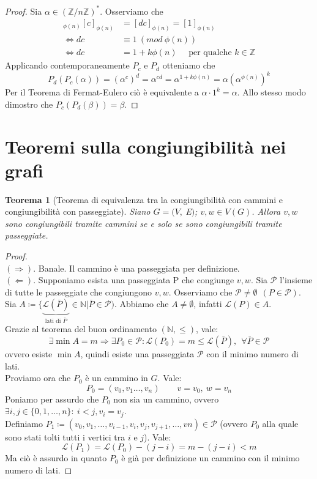 \documentclass[12pt,twoscolu]{article}
\newcommand{\N}{\mathbb{N}}
\newcommand{\Z}{\mathbb{Z}}
\newcommand{\sesolose}{\Leftrightarrow}
\newcommand{\implica}{\Longrightarrow}
\newcommand{\pq}{\text{ per qualche }}
\newcommand{\znz}{\displaystyle({\Z}/{n\Z})^*}
\newcommand{\Eps}{$E\:$}
\newcommand{\grafo}{(V, \: \Eps)}
\newtheorem{theorem}{Teorema}
\begin{document}
\begin{proof}
Sia $\alpha \in \znz$. Osserviamo che 
\begin{align*}
[d]_{\phi(n)}[c]_{\phi(n)} &= [dc]_{\phi(n)} = [1]_{\phi(n)} \\
\sesolose dc &\equiv 1 \ (mod \ \phi(n)) \\
\sesolose dc &= 1 + k\phi(n)\quad \pq k \in \Z
\end{align*}
Applicando contemporaneamente $P_c$ e $P_d$ otteniamo che 
$$ P_d(P_c(\alpha)) = (\alpha^c)^d = \alpha^{cd} = \alpha^{1+k\phi(n)} = \alpha(\alpha^{\phi(n)})^{k} $$
Per il Teorema di Fermat-Eulero ciò è equivalente a $\alpha \cdot 1^k = \alpha$. Allo stesso modo dimostro che $P_c(P_d(\beta)) = \beta$.
\end{proof}

\section{Teoremi sulla congiungibilità nei grafi}
\begin{theorem}[Teorema di equivalenza tra la congiungibilità con cammini e congiungibilità con passeggiate]
Siano $G = \grafo$; $v, w \in V(G)$. Allora $v, w$ sono congiungibili tramite cammini se e solo se sono congiungibili tramite passeggiate.
\end{theorem}

\begin{proof}\ \\
$(\implica)$. Banale. Il cammino è una passeggiata per definizione.\\
$(\Longleftarrow)$. Supponiamo esista una passeggiata P che congiunge $v, w$. Sia $\mathcal{P}$ l'insieme di tutte le passeggiate che congiungono $v, w$. Osserviamo che $\mathcal{P} \ne \emptyset \ \ (P \in \mathcal{P})$.\\
Sia $A \coloneqq \{ \underbrace{\mathcal{L}(\bar{P})}_{\text{lati di $\bar{P}$}} \in \N | \bar{P} \in \mathcal{P})$. Abbiamo che $A \ne \emptyset$, infatti $\mathcal{L}(P) \in A$.\\
Grazie al teorema del buon ordinamento $(\N, \le)$, vale:
$$ \exists \min A = m \implica \exists P_0 \in \mathcal{P} : \mathcal{L}(P_0) = m \le \mathcal{L}(\bar{P}),\ \ \forall \bar{P} \in \mathcal{P}$$
ovvero esiste $\min A$, quindi esiste una passeggiata $\mathcal{P}$ con il minimo numero di lati.\\
Proviamo ora che $P_0$ è un cammino in $G$. Vale:
$$ P_0 = (v_0, v_1\ldots, v_n)\qquad v = v_0,\ w = v_n$$
Poniamo per assurdo che $P_0$ non sia un cammino, ovvero $\exists i, j \in \{0, 1,\ldots, n\} : \ i < j, v_i = v_j$.\\
Definiamo $P_1 \coloneqq (v_0, v_1, \ldots , v_{i-1}, v_i, v_j, v_{j+1},\ldots, vn) \in \mathcal{P}$ (ovvero $P_0$ alla quale sono stati tolti tutti i vertici tra $i$ e $j$). Vale:
$$\mathcal{L}(P_1) = \mathcal{L}(P_0) - (j - i) = m - (j - i) < m$$
Ma ciò è assurdo in quanto $P_0$ è già per definizione un cammino con il minimo numero di lati.
\end{proof}
\end{document}

